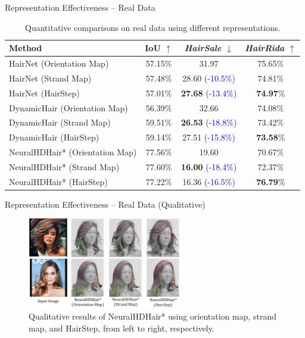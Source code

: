 \begin{frame}[t]{Representation Effectiveness -- Real Data}
    \begin{table}[h]
        \centering
        \small
        \renewcommand{\arraystretch}{1.1}
        \begin{tabular}{l|c|c|c}
            \hline
            \rowcolor{myLightBlue}
            Method & IoU $\uparrow$ & \textit{HairSale} $\downarrow$ & \textit{HairRida} $\uparrow$ \\
            \hline
            HairNet (Orientation Map) & 57.15$\%$ & 31.97 & 75.65$\%$ \\
            HairNet (Strand Map) & 57.48$\%$ & 28.60 \textcolor{blue}{(-10.5\%)} & 74.81$\%$ \\
            HairNet (HairStep) & 57.01$\%$ & \textbf{27.68} \textcolor{blue}{(-13.4\%)} & \textbf{74.97$\%$} \\
            \midrule
            DynamicHair (Orientation Map) & 56.39$\%$ & 32.66 & 74.08$\%$ \\
            DynamicHair (Strand Map) & 59.51$\%$ & \textbf{26.53} \textcolor{blue}{(-18.8\%)} & 73.42$\%$ \\
            DynamicHair (HairStep) & 59.14$\%$ & 27.51 \textcolor{blue}{(-15.8\%)} & \textbf{73.58$\%$} \\
            \midrule
            NeuralHDHair* (Orientation Map) & 77.56$\%$ & 19.60 & 70.67$\%$ \\
            NeuralHDHair* (Strand Map) & 77.60$\%$ & \textbf{16.00} \textcolor{blue}{(-18.4\%)} & 72.37$\%$ \\
            NeuralHDHair* (HairStep) & 77.22$\%$ & 16.36 \textcolor{blue}{(-16.5\%)} & \textbf{76.79$\%$} \\
            \bottomrule
        \end{tabular}
        \caption{Quantitative comparisons on real data using different representations.}
        \label{tab:representation_effectiveness_real}
    \end{table}
\end{frame}

\begin{frame}[t]{Representation Effectiveness -- Real Data (Qualitative)}
    \begin{figure}
        \centering
        \includegraphics[width=0.6\textwidth]{assets/figures/eval/neuralhdhair.png}
        \caption{Qualitative results of NeuralHDHair* using orientation map, strand map, and HairStep, from left to right, respectively.}
    \end{figure}
\end{frame}

